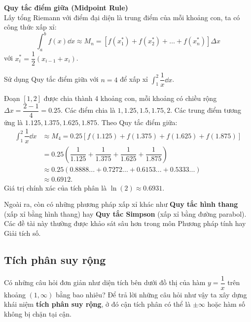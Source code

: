 \begin{importantbox}
    \textbf{Quy tắc điểm giữa (Midpoint Rule)} \\
    Lấy tổng Riemann với điểm đại diện là trung điểm của mỗi khoảng con, ta có công thức xấp xỉ:
    \[
        \int_a^b f(x) \dd x \approx M_n = [f(x_1^*) + f(x_2^*) + \dots + f(x_n^*)]\Delta x
    \]
    với $x_i^* = \dfrac{1}{2}(x_{i-1} + x_i)$.
\end{importantbox}

\begin{example}
    Sử dụng Quy tắc điểm giữa với $n = 4$ để xấp xỉ $\int_1^2 \dfrac{1}{x} \dd x$.
\end{example}
\begin{solution}
    Đoạn $[1, 2]$ được chia thành 4 khoảng con, mỗi khoảng có chiều rộng $\Delta x = \dfrac{2-1}{4} = 0.25$.
    Các điểm chia là $1, 1.25, 1.5, 1.75, 2$.
    Các trung điểm tương ứng là $1.125, 1.375, 1.625, 1.875$.
    Theo Quy tắc điểm giữa:
    \begin{align*}
        \int_1^2 \dfrac{1}{x} \dd x &\approx M_4 = 0.25 \left[ f(1.125) + f(1.375) + f(1.625) + f(1.875) \right] \\
        &= 0.25 \left( \dfrac{1}{1.125} + \dfrac{1}{1.375} + \dfrac{1}{1.625} + \dfrac{1}{1.875} \right) \\
        &\approx 0.25 (0.8888... + 0.7272... + 0.6153... + 0.5333...) \\
        &\approx 0.6912.
    \end{align*}
    Giá trị chính xác của tích phân là $\ln(2) \approx 0.6931$.
\end{solution}

Ngoài ra, còn có những phương pháp xấp xỉ khác như \textbf{Quy tắc hình thang} (xấp xỉ bằng hình thang) hay \textbf{Quy tắc Simpson} (xấp xỉ bằng đường parabol). Các đề tài này thường được khảo sát sâu hơn trong môn Phương pháp tính hay Giải tích số.

\subsection{Tích phân suy rộng}

Có những câu hỏi đơn giản như diện tích bên dưới đồ thị của hàm $y = \dfrac{1}{x}$ trên khoảng $(1, \infty)$ bằng bao nhiêu? Để trả lời những câu hỏi như vậy ta xây dựng khái niệm \textbf{tích phân suy rộng}, ở đó cận tích phân có thể là $\pm\infty$ hoặc hàm số không bị chặn tại cận.

